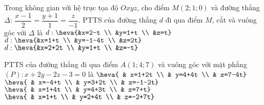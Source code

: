 \begin{ex}%
	Trong không gian với hệ trục tọa độ $Oxyz$, cho điểm $M(2;1;0)$ và đường thẳng $\Delta$: $\dfrac{x-1}{2}=\dfrac{y+1}{1}=\dfrac{z}{-1}$. PTTS của đường thẳng $d$ đi qua điểm $M$, cắt và vuông góc với $\Delta$ là
	{$d: \heva{&x=2-t \\ &y=1+t \\ &z=t}$}
	{$d: \heva{&x=1+t \\ &y=-1-4t \\ &z=2t}$}
	{$d: \heva{&x=2+2t \\ &y=1+t \\ &z=-t}$} 
\end{ex}
\begin{ex}%
	PTTS của đường thẳng đi qua điểm $A\left(1;4;7\right)$ và vuông góc với mặt phẳng $(P)\colon x+2y-2z-3=0$ là
	\choice
	{\True $\heva{
	& x=1+2t \\ 
	& y=4+4t \\ 
	& z=7-4t}$}
	{$\heva{
	& x=-4+t \\ 
	& y=3+2t \\ 
	& z=-1-2t}$}
	{$\heva{
	& x=1+4t \\ 
	& y=4+3t \\ 
	& z=7+t}$}
	{$\heva{
	& x=1+t \\ 
	& y=2+4t \\ 
	& z=-2+7t}$}
\end{ex}
